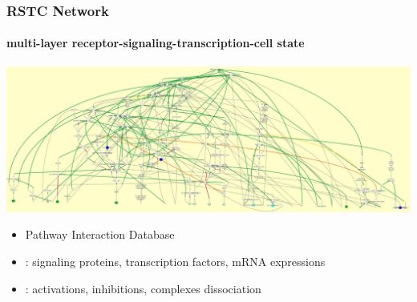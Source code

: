 \begin{frame}[c]
 \frametitle{RSTC Network}
 \framesubtitle{multi-layer receptor-signaling-transcription-cell state}

\begin{center}
  \includegraphics[scale=0.07]{figs/net.jpg}
\end{center}
 


\begin{itemize}
 \item Pathway Interaction Database
 \item {}: signaling proteins, transcription factors, mRNA expressions
 \item {}: activations, inhibitions, complexes dissociation
\end{itemize}

 
\end{frame}

